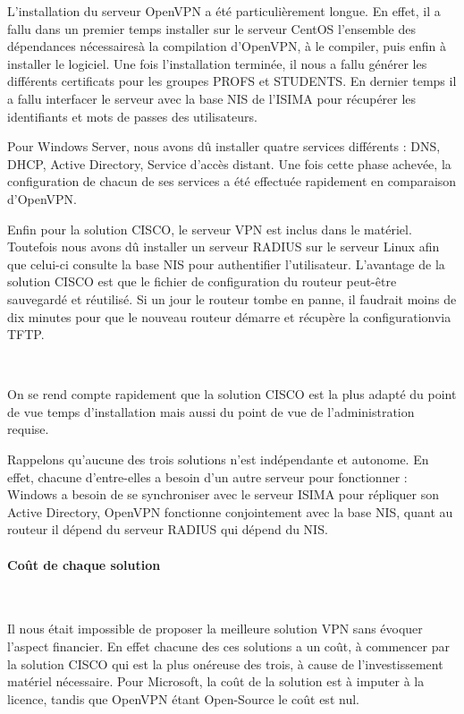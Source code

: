 L'installation du serveur OpenVPN a été particulièrement longue. En effet, il a fallu dans un premier temps installer sur le serveur CentOS l'ensemble des dépendances nécessairesà la compilation d'OpenVPN, à le compiler, puis enfin à installer le logiciel. Une fois l'installation terminée, il nous a fallu générer les différents certificats pour les groupes PROFS et STUDENTS. En dernier temps il a fallu interfacer le serveur avec la base NIS de l'ISIMA pour récupérer les identifiants et mots de passes des utilisateurs.

Pour Windows Server, nous avons dû installer quatre services différents : DNS, DHCP, Active Directory, Service d'accès distant. Une fois cette phase achevée, la configuration de chacun de ses services a été effectuée rapidement en comparaison d'OpenVPN.

Enfin pour la solution CISCO, le serveur VPN est inclus dans le matériel. Toutefois nous avons dû installer un serveur RADIUS sur le serveur Linux afin que celui-ci consulte la base NIS pour authentifier l'utilisateur. L'avantage de la solution CISCO est que le fichier de configuration du routeur peut-être sauvegardé et réutilisé. Si un jour le routeur tombe en panne, il faudrait moins de dix minutes pour que le nouveau routeur démarre et récupère la configurationvia TFTP.

~

On se rend compte rapidement que la solution CISCO est la plus adapté du point de vue temps d'installation mais aussi du point de vue de l'administration requise.

Rappelons qu'aucune des trois solutions n'est indépendante et autonome. En effet, chacune d'entre-elles a besoin d'un autre serveur pour fonctionner : Windows a besoin de se synchroniser avec le serveur ISIMA pour répliquer son Active Directory, OpenVPN fonctionne conjointement avec la base NIS, quant au routeur il dépend du serveur RADIUS qui dépend du NIS.

\paragraph{Coût de chaque solution}
~

Il nous était impossible de proposer la meilleure solution VPN sans évoquer l'aspect financier. En effet chacune des ces solutions a un coût, à commencer par la solution CISCO qui est la plus onéreuse des trois, à cause de l'investissement matériel nécessaire. Pour Microsoft, la coût de la solution est à imputer à la licence, tandis que OpenVPN étant Open-Source le coût est nul.

